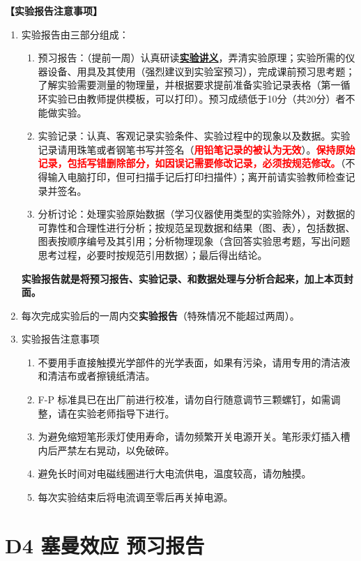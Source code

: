 \documentclass[dvipsnames, svgnames,a4paper,11pt]{article}
\begin{document}
\textbf{【实验报告注意事项】}
\begin{enumerate}
	\item 实验报告由三部分组成：
	\begin{enumerate}
		\item 预习报告：（提前一周）认真研读\underline{\textbf{实验讲义}}，弄清实验原理；实验所需的仪器设备、用具及其使用（强烈建议到实验室预习），完成课前预习思考题；了解实验需要测量的物理量，并根据要求提前准备实验记录表格（第一循环实验已由教师提供模板，可以打印）。预习成绩低于10分（共20分）者不能做实验。
	    \item 实验记录：认真、客观记录实验条件、实验过程中的现象以及数据。实验记录请用珠笔或者钢笔书写并签名（\textcolor{red}{\textbf{用铅笔记录的被认为无效}}）。\textcolor{red}{\textbf{保持原始记录，包括写错删除部分，如因误记需要修改记录，必须按规范修改。}}（不得输入电脑打印，但可扫描手记后打印扫描件）；离开前请实验教师检查记录并签名。
	    \item 分析讨论：处理实验原始数据（学习仪器使用类型的实验除外），对数据的可靠性和合理性进行分析；按规范呈现数据和结果（图、表），包括数据、图表按顺序编号及其引用；分析物理现象（含回答实验思考题，写出问题思考过程，必要时按规范引用数据）；最后得出结论。
	\end{enumerate}
	\textbf{实验报告就是将预习报告、实验记录、和数据处理与分析合起来，加上本页封面。}
	\item 每次完成实验后的一周内交\textbf{实验报告}（特殊情况不能超过两周）。
	\item 实验报告注意事项
		\begin{enumerate}[label=\roman*.]
			\small %
			\item 不要用手直接触摸光学部件的光学表面，如果有污染，请用专用的清洁液和清洁布或者擦镜纸清洁。
			\item F-P 标准具已在出厂前进行校准，请勿自行随意调节三颗螺钉，如需调整，请在实验老师指导下进行。
			\item 为避免缩短笔形汞灯使用寿命，请勿频繁开关电源开关。笔形汞灯插入槽内后严禁左右晃动，以免破碎。
			\item 避免长时间对电磁线圈进行大电流供电，温度较高，请勿触摸。
			\item 每次实验结束后将电流调至零后再关掉电源。
		\end{enumerate}
\end{enumerate}


\clearpage
\tableofcontents
\clearpage

\setcounter{section}{0}
\section{D4 \quad 塞曼效应 \quad\heiti 预习报告}
	
\end{document}
